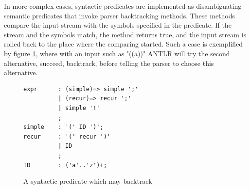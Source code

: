 In more complex cases, syntactic predicates are implemented as disambiguating semantic predicates that invoke parser backtracking methods. These methods compare the input stream with the symbols specified in the predicate. If the stream and the symbols match, the method returns true, and the input stream is rolled back to the place where the comparing started. Such a case is exemplified by figure \ref{code:complexSyntactic}, where with an input such as "((a))" ANTLR will try the second alternative, succeed, backtrack, before telling the parser to choose this alternative.
\begin{figure}[h!]
\begin{verbatim}
expr      : (simple)=> simple ';'
          | (recur)=> recur ';'  
          | simple '!'
          ;
simple    : '(' ID ')';
recur     : '(' recur ')'
          | ID
          ;
ID        : ('a'..'z')+;
\end{verbatim}
\caption{A syntactic predicate which may backtrack}
\label{code:complexSyntactic}
\end{figure}